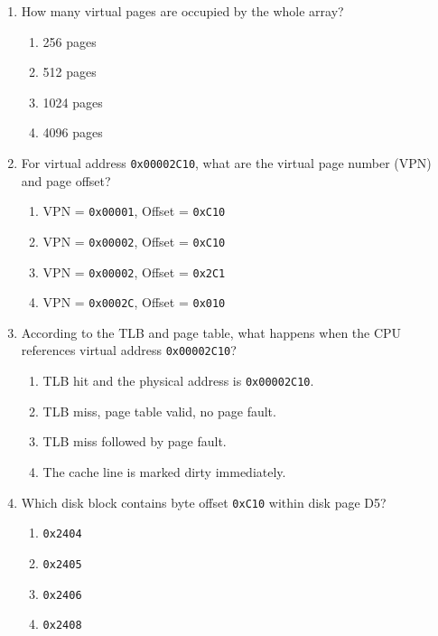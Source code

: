\documentclass[a4paper,12pt]{article}
\begin{document}
\begin{enumerate}[label=\textbf{\arabic*.}]
    \item How many virtual pages are occupied by the whole array?
    \begin{enumerate}[label=\alph*)]
        \item 256 pages
        \item 512 pages
        \item 1024 pages
        \item 4096 pages
    \end{enumerate}

    \item For virtual address \texttt{0x00002C10}, what are the virtual page number (VPN) and page offset?
    \begin{enumerate}[label=\alph*)]
        \item VPN = \texttt{0x00001}, Offset = \texttt{0xC10}
        \item VPN = \texttt{0x00002}, Offset = \texttt{0xC10}
        \item VPN = \texttt{0x00002}, Offset = \texttt{0x2C1}
        \item VPN = \texttt{0x0002C}, Offset = \texttt{0x010}
    \end{enumerate}

    \item According to the TLB and page table, what happens when the CPU references virtual address \texttt{0x00002C10}?
    \begin{enumerate}[label=\alph*)]
        \item TLB hit and the physical address is \texttt{0x00002C10}.
        \item TLB miss, page table valid, no page fault.
        \item TLB miss followed by page fault.
        \item The cache line is marked dirty immediately.
    \end{enumerate}

    \item Which disk block contains byte offset \texttt{0xC10} within disk page D5?
    \begin{enumerate}[label=\alph*)]
        \item \texttt{0x2404}
        \item \texttt{0x2405}
        \item \texttt{0x2406}
        \item \texttt{0x2408}
    \end{enumerate}


\end{enumerate}
\end{document}

